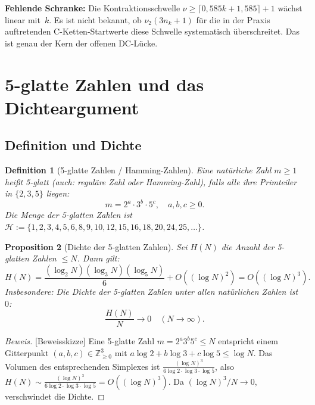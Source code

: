 \documentclass[12pt,a4paper]{article}
\newtheorem{definition}{Definition}[section]
\newtheorem{proposition}[definition]{Proposition}
\newenvironment{beweis}{\begin{proof}[Beweis]}{\end{proof}}
\newcommand{\vii}{\nu_2}
\newcommand{\Z}{\mathbb{Z}}
\begin{document}
	\begin{tcolorbox}[warnung]
		\textbf{Fehlende Schranke:} Die Kontraktionsschwelle $\nu \geq \lceil 0{,}585k + 1{,}585 \rceil + 1$
		wächst linear mit~$k$. Es ist nicht bekannt, ob $\vii(3n_k+1)$ für
		die in der Praxis auftretenden C-Ketten-Startwerte diese Schwelle
		systematisch überschreitet. Das ist genau der Kern der offenen DC-Lücke.
	\end{tcolorbox}
	
	\section{5-glatte Zahlen und das Dichteargument}
	\label{sec:fglatt}
	
	\subsection{Definition und Dichte}
	
	\begin{definition}[5-glatte Zahlen / Hamming-Zahlen]
		Eine natürliche Zahl $m \geq 1$ heißt \emph{5-glatt} (auch: \emph{reguläre Zahl}
		oder \emph{Hamming-Zahl}), falls alle ihre Primteiler in $\{2, 3, 5\}$ liegen:
		\[
		m = 2^a \cdot 3^b \cdot 5^c, \quad a, b, c \geq 0.
		\]
		Die Menge der 5-glatten Zahlen ist $\mathcal{H} := \{1, 2, 3, 4, 5, 6, 8, 9,
		10, 12, 15, 16, 18, 20, 24, 25, \ldots\}$.
	\end{definition}
	
	\begin{proposition}[Dichte der 5-glatten Zahlen]
		\label{prop:dichte-5glatt}
		Sei $H(N)$ die Anzahl der 5-glatten Zahlen $\leq N$. Dann gilt:
		\[
		H(N) = \frac{(\log_2 N)(\log_3 N)(\log_5 N)}{6} + O\!\left((\log N)^2\right)
		= O\!\left((\log N)^3\right).
		\]
		Insbesondere: Die Dichte der 5-glatten Zahlen unter allen natürlichen Zahlen
		ist~$0$:
		\[
		\frac{H(N)}{N} \to 0 \quad (N \to \infty).
		\]
	\end{proposition}
	
	\begin{beweis}[Beweisskizze]
		Eine 5-glatte Zahl $m = 2^a 3^b 5^c \leq N$ entspricht einem Gitterpunkt
		$(a,b,c) \in \Z_{\geq 0}^3$ mit $a\log 2 + b\log 3 + c\log 5 \leq \log N$.
		Das Volumen des entsprechenden Simplexes ist
		$\frac{(\log N)^3}{6 \log 2 \cdot \log 3 \cdot \log 5}$, also
		$H(N) \sim \frac{(\log N)^3}{6\log 2 \cdot \log 3 \cdot \log 5} = O((\log N)^3)$.
		Da $(\log N)^3 / N \to 0$, verschwindet die Dichte. \qedhere
	\end{beweis}
	
\end{document}
